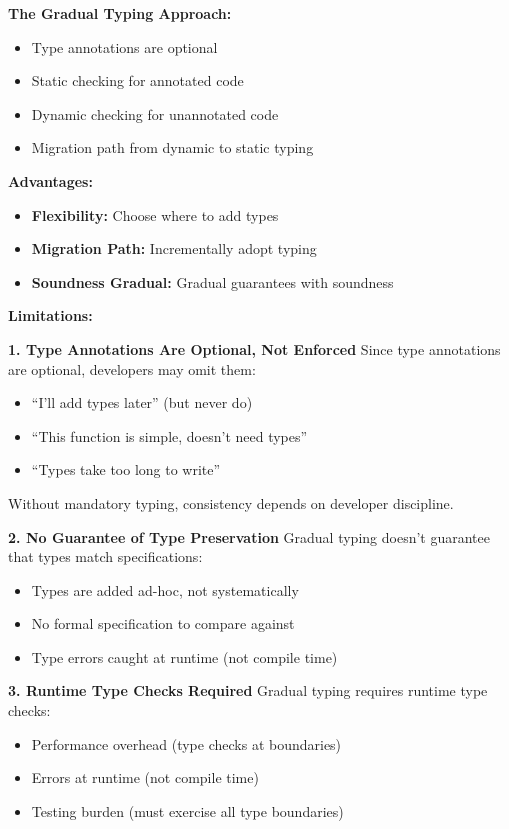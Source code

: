 \textbf{The Gradual Typing Approach:}
\begin{itemize}
    \item Type annotations are optional
    \item Static checking for annotated code
    \item Dynamic checking for unannotated code
    \item Migration path from dynamic to static typing
\end{itemize}

\textbf{Advantages:}
\begin{itemize}
    \item \textbf{Flexibility:} Choose where to add types
    \item \textbf{Migration Path:} Incrementally adopt typing
    \item \textbf{Soundness Gradual:} Gradual guarantees with soundness
\end{itemize}

\textbf{Limitations:}

\textbf{1. Type Annotations Are Optional, Not Enforced}
Since type annotations are optional, developers may omit them:
\begin{itemize}
    \item ``I'll add types later'' (but never do)
    \item ``This function is simple, doesn't need types''
    \item ``Types take too long to write''
\end{itemize}

Without mandatory typing, consistency depends on developer discipline.

\textbf{2. No Guarantee of Type Preservation}
Gradual typing doesn't guarantee that types match specifications:
\begin{itemize}
    \item Types are added ad-hoc, not systematically
    \item No formal specification to compare against
    \item Type errors caught at runtime (not compile time)
\end{itemize}

\textbf{3. Runtime Type Checks Required}
Gradual typing requires runtime type checks:
\begin{itemize}
    \item Performance overhead (type checks at boundaries)
    \item Errors at runtime (not compile time)
    \item Testing burden (must exercise all type boundaries)
\end{itemize}

